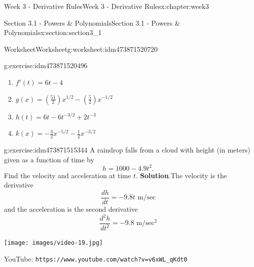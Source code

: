 \documentclass[oneside,10pt,]{book}
\newcommand{\blocktitlefont}{\relax}
\newcommand{\mono}[1]{\texttt{#1}}
\numberwithin{equation}{section}
\newlength{\qrsize}
\newlength{\previewwidth}
\begin{document}
\begin{chapterptx}{Week 3 - Derivative Rules}{}{Week 3 - Derivative Rules}{}{}{x:chapter:week3}
\begin{sectionptx}{Section 3.1 - Powers \& Polynomials}{}{Section 3.1 - Powers \& Polynomials}{}{}{x:section:section3_1}
\begin{worksheet-subsection}{Worksheet}{}{Worksheet}{}{}{g:worksheet:idm473871520720}
\begin{divisionexercise}{1}{}{}{g:exercise:idm473871520496}
\begin{enumerate}[label=(\alph*)]
\item{}\(\displaystyle f'(t) = 6t-4 \)%
\item{}\(\displaystyle g(x) = \left(\frac{51}{2}\right)x^{1/2} - \left( \frac 52 \right) x^{-1/2}\)%
\item{}\(\displaystyle h(t) = 6t -6t^{-3/2} +2t^{-3}\)%
\item{}\(\displaystyle k(x) = -\frac 32 x^{-5/2} - \frac 12 x^{-3/2}\)%
\end{enumerate}
\end{divisionexercise}%
\begin{divisionexercise}{2}{}{}{g:exercise:idm473871515344}%
A raindrop falls from a cloud with height (in meters) given as a function of time by%
\begin{equation*}
h=1000-4.9t^2.
\end{equation*}
Find the velocity and acceleration at time \(t\).%
\textbf{\blocktitlefont Solution}.\hypertarget{g:solution:idm473871514144}{}\quad{}The velocity is the derivative%
\begin{equation*}
\frac{dh}{dt} = -9.8 t \text{ m}/\text{sec}
\end{equation*}
and the acceleration is the second derivative%
\begin{equation*}
\frac{d^2h}{dt^2} = -9.8 \text{ m}/\text{sec}^2
\end{equation*}
%
\end{divisionexercise}%
\end{worksheet-subsection}
\restoregeometry
\setlength{\qrsize}{9em}
\setlength{\previewwidth}{\linewidth}
\addtolength{\previewwidth}{-\qrsize}
\begin{tcbraster}[raster columns=2, raster column skip=1pt, raster halign=center, raster force size=false, raster left skip=0pt, raster right skip=0pt]%
\begin{tcolorbox}[previewstyle, width=\previewwidth]%
\texttt{[image: images/video-19.jpg]}%
\end{tcolorbox}%
\begin{tcolorbox}[qrstyle]%
{\hypersetup{urlcolor=black}}%
\end{tcolorbox}%
\begin{tcolorbox}[captionstyle]%
\small YouTube: \mono{https://www.youtube.com/watch?v=v6xWL\_qKdt0}\end{tcolorbox}%
\end{tcbraster}%
\end{sectionptx}
%
%
\typeout{************************************************}

\end{chapterptx}
\end{document}
